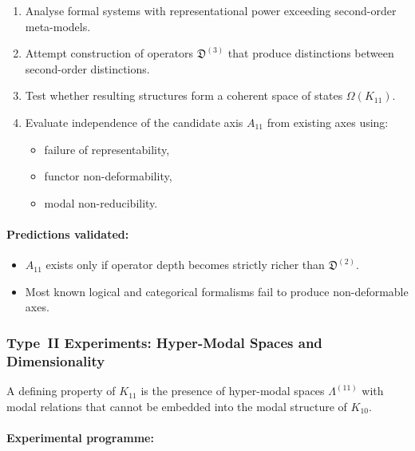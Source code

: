 \begin{enumerate}
    \item Analyse formal systems with representational power exceeding 
          second-order meta-models.
    \item Attempt construction of operators $\mathfrak{D}^{(3)}$ 
          that produce distinctions between second-order distinctions.
    \item Test whether resulting structures form a coherent space 
          of states $\Omega(K_{11})$.
    \item Evaluate independence of the candidate axis $A_{11}$ from 
          existing axes using:
          \begin{itemize}
              \item failure of representability,
              \item functor non-deformability,
              \item modal non-reducibility.
          \end{itemize}
\end{enumerate}

\paragraph{Predictions validated:}

\begin{itemize}
    \item $A_{11}$ exists only if operator depth becomes strictly 
          richer than $\mathfrak{D}^{(2)}$.
    \item Most known logical and categorical formalisms fail to 
          produce non-deformable axes.
\end{itemize}



\subsubsection{Type~II Experiments: Hyper-Modal Spaces and Dimensionality}

A defining property of $K_{11}$ is the presence of 
hyper-modal spaces $\Lambda^{(11)}$ with modal relations that cannot 
be embedded into the modal structure of $K_{10}$.

\paragraph{Experimental programme:}

